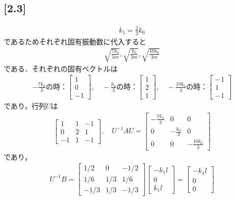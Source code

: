 \documentclass[12pt,dvipdfmx]{jsarticle}
\begin{document}
\subsection*{\large{[2.3]}}
\begin{eqnarray}
  k_1 = \frac{2}{3}k_0
\end{eqnarray}
であるためそれぞれ固有振動数に代入すると
\begin{eqnarray}
  \sqrt{ \frac{7k_0}{3m} }, \sqrt{ \frac{k_0}{3m} }, \sqrt{ \frac{10k_0}{3m} }
\end{eqnarray}
である．それぞれの固有ベクトルは
\begin{eqnarray}
  -\frac{7k_0}{3}の時：
  \begin{bmatrix}
    1\\
    0\\
    -1
  \end{bmatrix},\quad -\frac{k_0}{3}の時：
  \begin{bmatrix}
    1\\
    2\\
    1
  \end{bmatrix},\quad -\frac{10k_0}{3}の時：
  \begin{bmatrix}
    -1\\
    1\\
    -1
  \end{bmatrix}
\end{eqnarray}
であり，行列$U$は
\begin{eqnarray}
  \begin{bmatrix}
    1 & 1 & -1\\
    0 & 2 & 1\\
    -1 & 1 & -1
  \end{bmatrix},\quad U^{-1}AU = 
  \begin{bmatrix}
    -\frac{7k_0}{3} & 0 & 0\\
    0 & -\frac{k_0}{3} & 0\\
    0 & 0 & -\frac{10k_0}{3}
  \end{bmatrix}
\end{eqnarray}
であり，
\begin{eqnarray}
  U^{-1}B = 
  \begin{bmatrix}
    1/2 & 0& -1/2\\
    1/6 & 1/3 & 1/6\\
    -1/3 & 1/3 & -1/3
  \end{bmatrix}
  \begin{bmatrix}
    -k_1 l\\
    0 \\
    k_1l
  \end{bmatrix}
  =
  \begin{bmatrix}
    -k_1l\\
    0\\
    0
  \end{bmatrix}
\end{eqnarray}
\end{document}
